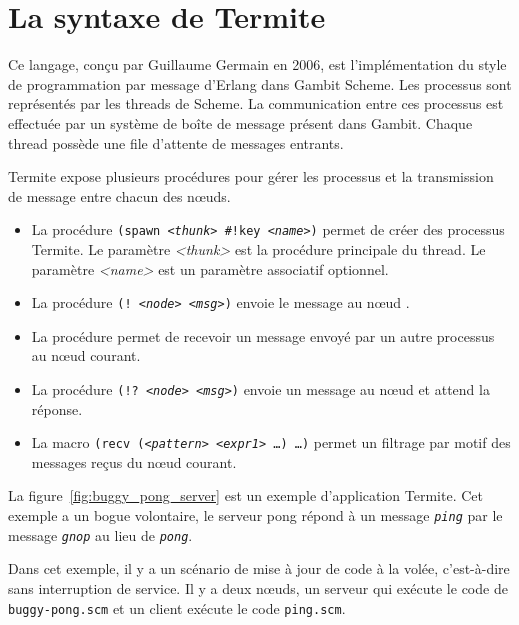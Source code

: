 \section{La syntaxe de Termite}

Ce langage, conçu par Guillaume Germain en 2006, est l'implémentation du style
de programmation par message d'Erlang dans Gambit Scheme.  Les processus sont
représentés par les threads de Scheme. La communication entre ces processus est
effectuée par un système de boîte de message présent dans Gambit. Chaque thread
possède une file d'attente de messages entrants.

Termite expose plusieurs procédures pour gérer les processus et la transmission
de message entre chacun des nœuds.

\begin{itemize}
  \item La procédure \texttt{(spawn \textit{<thunk>} \#!key \textit{<name>})} permet de
    créer des processus Termite. Le paramètre \textit{<thunk>} est la procédure principale
    du thread. Le paramètre \textit{<name>} est un paramètre associatif optionnel.

  \item La procédure \texttt{(! \textit{<node>} \textit{<msg>})} envoie le message
     au nœud .

  \item La procédure  permet de recevoir un message
    envoyé par un autre processus au nœud courant.

  \item La procédure \texttt{(!? \textit{<node>} \textit{<msg>})} envoie un message au
    nœud  et attend la réponse.

  \item La macro \texttt{(recv (\textit{<pattern>} \textit{<expr1>} \dots) \dots)}
    permet un filtrage par motif des messages reçus du nœud courant.

\end{itemize}

La figure~\ref{fig:buggy_pong_server} est un exemple d'application Termite.
Cet exemple a un bogue volontaire, le serveur pong répond à un message
\texttt{\itshape ping} par le message \texttt{\itshape gnop} au lieu de
\texttt{\itshape pong}.

Dans cet exemple, il y a un scénario de mise à jour de code à la volée,
c'est-à-dire sans interruption de service. Il y a deux nœuds, un serveur
qui exécute le code de \texttt{buggy-pong.scm} et un client exécute le
code \texttt{ping.scm}.

